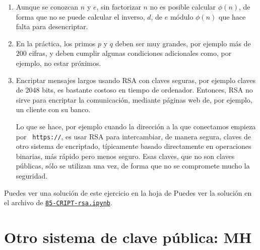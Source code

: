 \begin{enumerate}
\item Aunque se conozcan $n$ y $e$, sin factorizar $n$ no es posible calcular
$\phi(n)$, de forma que no se puede calcular el inverso, $d$, de $e$ m\'odulo
$\phi(n)$ que hace falta para desencriptar.

\item En la pr\'actica, los primos $p$ y $q$ deben ser muy grandes, por ejemplo
m\'as de $200$ cifras, y deben cumplir algunas condiciones adicionales como, por
ejemplo, no estar pr\'oximos. 

\item Encriptar mensajes largos usando RSA con claves seguras, por ejemplo
claves de $2048$ bits, es bastante costoso en tiempo de ordenador. Entonces, RSA
no sirve  para encriptar la comunicaci\'on, mediante p\'aginas web de, por
ejemplo, un cliente con su banco.

Lo que se hace, por ejemplo cuando la direcci\'on a la que conectamos empieza 
por {\tt
https://}, es usar RSA  para intercambiar, de manera segura,  claves de otro
sistema de encriptado, t\'ipicamente basado directamente en operaciones
binarias,  m\'as r\'apido pero menos seguro. Esas claves, que no son claves
p\'ublicas,  s\'olo se utilizan una vez,  de forma que no se compromete mucho la
seguridad.


\end{enumerate}

Puedes ver una soluci\'on de este ejercicio en la hoja de {\sage}
Puedes ver la soluci\'on en el archivo de {\sage}
\href{http://localhost:8888/notebooks/CRIPT/??}{\tt 85-CRIPT-rsa.ipynb}.

\section{Otro sistema de clave p\'ublica: MH}


